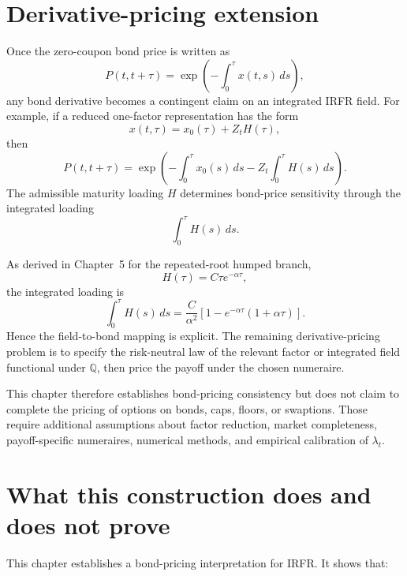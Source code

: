 \documentclass[11pt,oneside]{book}
\begin{document}
\section{Derivative-pricing extension}
\label{derivative-pricing-extension}

Once the zero-coupon bond price is written as
\[
P(t,t+\tau)
=
\exp\left(-\int_0^\tau x(t,s)\,ds\right),
\]
any bond derivative becomes a contingent claim on an integrated IRFR
field. For example, if a reduced one-factor representation has the form
\[
x(t,\tau)=x_0(\tau)+Z_tH(\tau),
\]
then
\[
P(t,t+\tau)
=
\exp\left(
-
\int_0^\tau x_0(s)\,ds
-
Z_t\int_0^\tau H(s)\,ds
\right).
\]
The admissible maturity loading \(H\) determines bond-price sensitivity
through the integrated loading
\[
\int_0^\tau H(s)\,ds.
\]

As derived in Chapter~5 for the repeated-root humped branch,
\[
H(\tau)=C\tau e^{-\alpha\tau},
\]
the integrated loading is
\[
\int_0^\tau H(s)\,ds
=
\frac{C}{\alpha^2}
\left[1-e^{-\alpha\tau}(1+\alpha\tau)\right].
\]
Hence the field-to-bond mapping is explicit. The remaining
derivative-pricing problem is to specify the risk-neutral law of the
relevant factor or integrated field functional under \(\mathbb Q\), then
price the payoff under the chosen numeraire.

This chapter therefore establishes bond-pricing consistency but does not
claim to complete the pricing of options on bonds, caps, floors, or
swaptions. Those require additional assumptions about factor reduction,
market completeness, payoff-specific numeraires, numerical methods, and
empirical calibration of \(\lambda_t\).

\section{What this construction does and does not prove}
\label{what-this-construction-does-and-does-not-prove}

This chapter establishes a bond-pricing interpretation for IRFR. It shows
that:
\end{document}
